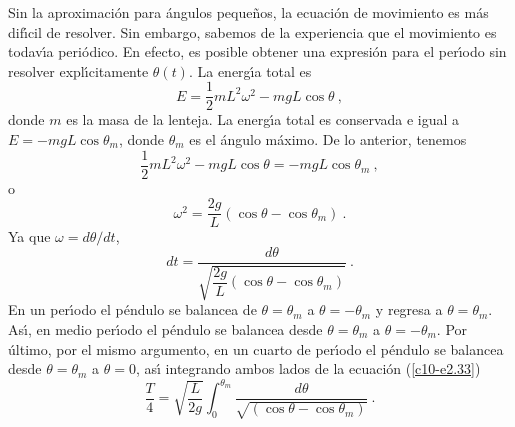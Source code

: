 Sin la aproximaci{\'o}n para {\'a}ngulos peque{\~n}os, la ecuaci{\'o}n de movimiento
es m{\'a}s dif{\'\i}cil de resolver. Sin embargo, sabemos de la experiencia que
el movimiento es todav{\'\i}a peri{\'o}dico. En efecto, es posible obtener una
expresi{\'o}n para el per{\'\i}odo sin resolver expl{\'\i}citamente $\theta(t)$. La
energ{\'\i}a total es
\begin{equation}
\label{c10-e2.30}
E=\frac 12 m L^2\omega^2- mgL\cos \theta\ ,
\end{equation}
donde $m$ es la masa de la lenteja. La energ{\'\i}a total es conservada e
igual a $E=-mgL\cos \theta_m$, donde $\theta_m$ es el {\'a}ngulo m{\'a}ximo. De lo
anterior, tenemos 
\begin{equation}
\label{c10-e2.31}
\frac 12 m L^2\omega^2 -mgL\cos \theta = -mgL\cos \theta_m\ ,
\end{equation}
o
\begin{equation}
\label{c10-e2.32}
\omega^2 =\frac{2g}L \left ( \cos \theta - \cos \theta_m \right ) \ .
\end{equation}
Ya que $\omega=d\theta/dt$, 
\begin{equation}
\label{c10-e2.33}
dt=\frac{d\theta}{\sqrt{\dfrac {2g}L \left ( \cos \theta - \cos \theta_m \right
    )}}\ .
\end{equation} 
En un per{\'\i}odo el p{\'e}ndulo se balancea de $\theta=\theta_m$ a $\theta=-\theta_m$ y regresa a
$\theta=\theta_m$. As{\'\i}, en medio per{\'\i}odo el p{\'e}ndulo se balancea desde $\theta=\theta_m$ a
$\theta=-\theta_m$. Por {\'u}ltimo, por el mismo argumento, en un cuarto de per{\'\i}odo
el p{\'e}ndulo se balancea desde $\theta=\theta_m$ a $\theta=0$, as{\'\i} integrando ambos
lados de la ecuaci{\'o}n (\ref{c10-e2.33})
\begin{equation}
\label{c10-e2.34}
\frac{T}{4}=\sqrt{\frac L{2g} } \int_0^{\theta_m}\frac{d\theta}{\sqrt{\left ( \cos \theta - \cos \theta_m \right
    )}}\ .
\end{equation} 

